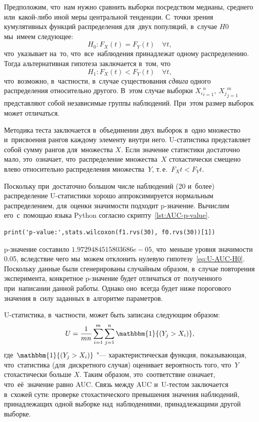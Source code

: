 \documentclass[]{scrreprt}
\begin{document}
Предположим, что~нам нужно сравнить выборки посредством медианы, среднего или~какой-либо иной меры центральной тенденции. С~точки зрения кумулятивных функций распределения для~двух популяций, в~случае $H0$ мы~имеем следующее:
\begin{equation}\label{eq:U-AUC-H0}
H_0: F_{X}(t) = F_{Y}(t) \quad \forall t,
\end{equation}
что~указывает на~то, что~все~наблюдения принадлежат одному распределению. Тогда альтернативная гипотеза заключается в~том, что
\begin{equation}\label{eq:U-AUC-H1}
H_1: F_{X}(t) < F_{Y}(t) \quad \forall t,
\end{equation}
что~возможно, в~частности, в~случае существования \emph{сдвига} одного распределения относительно другого. В~этом случае выборки ${X_{i}}_{i=1}^{n},\ {X_{j}}_{j=1}^{m}$ представляют собой независимые группы наблюдений. При~этом размер выборок может отличаться.

Методика теста заключается в~объединении двух выборок в~одно множество и~присвоения рангов каждому элементу внутри него. U-статистика представляет собой сумму рангов для~множества $X$. Если значение статистики достаточно мало, это~означает, что~распределение множества~$X$ стохастически смещено влево относительно распределения множества~$Y$, т.\,е.~$F_{X}{t} < F_{Y}{t}$.

Поскольку при~достаточно большом числе наблюдений (20 и~более) распределение U-статистики хорошо аппроксимируется нормальным распределением, для~оценки значимости подходит p-значение. Вычислим его~с~помощью языка Python согласно скрипту~\ref{lst:AUC-p-value}.
%
\begin{lstlisting}[float, caption = Вычисление p-значения для~тестовых данных, firstnumber=1, label= lst:AUC-p-value]
print('p-value:',stats.wilcoxon(f1.rvs(30), f0.rvs(30))[1])
\end{lstlisting}
%
p-значение составило $1.9729484515803686e-05$, что~меньше уровня значимости 0.05, вследствие чего мы~можем отклонить нулевую гипотезу~\ref{eq:U-AUC-H0}. Поскольку данные были сгенерированы случайным образом, в~случае повторения эксперимента, конкретное p-значение будет отличаться от~полученного при~написании данной работы. Однако оно~всегда будет ниже порогового значения в~силу заданных в~алгоритме параметров.

U-статистика, в~частности, может быть записана следующим образом:
\begin{equation}\label{eq:U-statistics}
U = \frac{1}{mn}\sum_{i=1}^{m}\sum_{j=1}^{n}\mathbbm{1}{(Y_{j}>X_{i})},
\end{equation}
где~$\mathbbm{1}{(Y_{j}>X_{i})}$ "--- характеристическая функция, показывающая, что~статистика (для~дискретного случая) оценивает вероятность того, что~$Y$ стохастически больше $X$. Таким образом, это~соответствие означает, что~её~значение равно AUC. Связь между AUC и~U-тестом заключается в~схожей сути: проверке стохастического превышения значения наблюдений, принадлежащих одной выборке над~наблюдениями, принадлежащими другой выборке.
\end{document}
